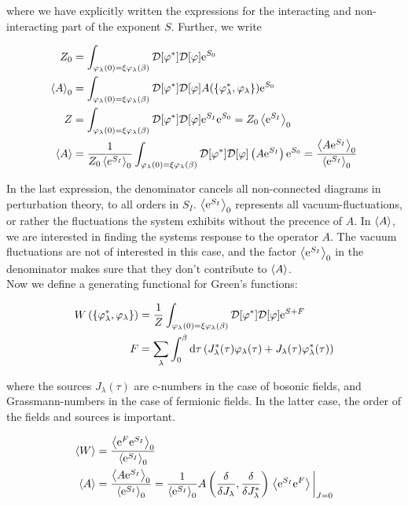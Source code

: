 where we have explicitly written the expressions for the interacting and non-interacting part of the exponent $S$. Further, we write 

\begin{align*}
    Z_0 &= \int_{\varphi_\lambda(0) = \xi \varphi_\lambda(\beta)} \mathcal{D} [\varphi^*] \mathcal{D}[\varphi]\mathrm{e}^{S_0} \\ 
    \expval{A}_0 &= \int_{\varphi_\lambda(0) = \xi \varphi_\lambda(\beta)} \mathcal{D} [\varphi^*] \mathcal{D}[\varphi]A(\{\varphi_\lambda^*, \varphi_\lambda\})\mathrm{e}^{S_0} \\ 
    Z &= \int_{\varphi_\lambda(0) = \xi \varphi_\lambda(\beta)} \mathcal{D} [\varphi^*] \mathcal{D}[\varphi]\mathrm{e}^{S_I}\mathrm{e}^{S_0} = Z_0 \expval{\mathrm{e}^{S_I}}_0 \\ 
    \expval{A} &= \frac{1}{Z_0 \expval{e^{S_I}}_0} \int_{\varphi_\lambda(0) = \xi \varphi_\lambda(\beta)} \mathcal{D} [\varphi^*] \mathcal{D}[\varphi]\left( A\mathrm{e}^{S_I} \right)\mathrm{e}^{S_0} = \frac{\expval{A\mathrm{e}^{S_I}}_0}{\expval{\mathrm{e}^{S_I}}_0}
\end{align*}

In the last expression, the denominator cancels all non-connected diagrams in perturbation theory, to all orders in $S_I$. $\expval{\mathrm{e}^{S_I}}_0$ represents all vacuum-fluctuations, or rather the fluctuations the system exhibits without the precence of $A$. In $\expval{A}$, we are interested in finding the systems response to the operator $A$. The vacuum fluctuations are not of interested in this case, and the factor $\expval{\mathrm{e}^{S_I}}_0$ in the denominator makes sure that they don't contribute to $\expval{A}$. \\ 

Now we define a generating functional for Green's functions: 

\begin{align*}
    W\left(\{\varphi_\lambda^*, \varphi_\lambda\}\right) &= \frac{1}{Z}\int_{\varphi_\lambda(0) = \xi \varphi_\lambda(\beta)} \mathcal{D} [\varphi^*] \mathcal{D}[\varphi]\mathrm{e}^{S + F} \\ 
    F &= \sum_\lambda \int_{0}^{\beta} \dd \tau \left( J_\lambda ^*(\tau)\varphi_\lambda(\tau) + J_\lambda (\tau)\varphi_\lambda ^*(\tau) \right)
\end{align*}

where the sources $J_\lambda(\tau)$ are c-numbers in the case of bosonic fields, and Grassmann-numbers in the case of fermionic fields. In the latter case, the order of the fields and sources is important. 

\begin{align*}
    \expval{W}&= \frac{\expval{\e^F\e^{S_I}}_0}{\expval{\e^{S_I}}_0} \\ 
    \expval{A} &= \frac{\expval{A\e^{S_I}}_0}{\expval{\e^{S_I}}_0} = \frac{1}{\expval{\e^{S_I}}_0} A\left( \fdv{}{J_\lambda }, \fdv{}{J_\lambda ^*} \right) \eval{\expval{\e^{S_I} \e^F}}_{J = 0}
\end{align*}

